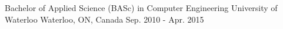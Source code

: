

\begin{cventries}

  \cventrynodescription
    {Bachelor of Applied Science (BASc) in Computer Engineering} %
    {University of Waterloo} %
    {Waterloo, ON, Canada} %
    {Sep. 2010 - Apr. 2015} %

\end{cventries}
